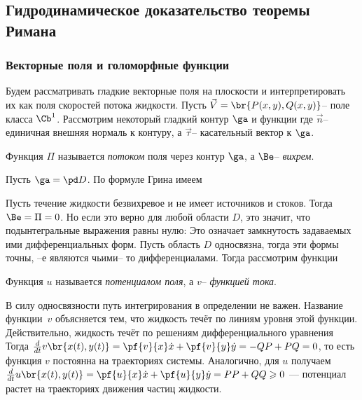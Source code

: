 \documentclass[a4paper]{article}
\begin{document}
\subsection{Гидродинамическое доказательство теоремы Римана}

\subsubsection{Векторные поля и голоморфные функции}

Будем рассматривать гладкие векторные поля на плоскости и интерпретировать их как
поля скоростей потока жидкости.
Пусть $\vec V = \br{P(x,y),Q(x,y)}$-- поле класса $\Cb^1$.
Рассмотрим некоторый гладкий контур $\ga$ и функции
где $\vec n$-- единичная внешняя нормаль к контуру, а $\vec \tau$-- касательный вектор к $\ga$.

\begin{df}
Функция $\Pi$ называется \emph{потоком} поля через контур $\ga$, а $\Be$-- \emph{вихрем}.
\end{df}

Пусть $\ga = \pd D$. По формуле Грина имеем

Пусть течение жидкости безвихревое и не имеет источников и стоков. Тогда $\Be=\Pi=0$.
Но если это верно для любой области $D$, это значит, что подынтегральные выражения равны нулю:
Это означает замкнутость задаваемых ими
дифференциальных форм. Пусть область $D$ односвязна, тогда эти формы точны, --е являются
чьими-- то дифференциалами. Тогда рассмотрим функции

\begin{df}
Функция $u$ называется \emph{потенциалом поля}, а $v$--
\emph{функцией тока}.
\end{df}

В силу односвязности путь интегрирования в определении не важен. Название функции~$v$
объясняется тем, что жидкость течёт по линиям уровня этой функции. Действительно,
жидкость течёт по решениям дифференциального уравнения
Тогда $\frac{d}{dt}v\br{x(t),y(t)} = \pf{v}{x}\dot x + \pf{v}{y} \dot y = -QP + PQ = 0$,
то есть функция $v$ постоянна на траекториях системы. Аналогично, для $u$ получаем
$\frac{d}{dt}u\br{x(t),y(t)} = \pf{u}{x}\dot x + \pf{u}{y} \dot y = PP + QQ \geqslant 0$ ---
потенциал растет на траекториях движения частиц жидкости.
\end{document}
